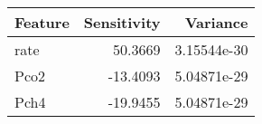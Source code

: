 \begin{longtable}{lrr}
\hline
 Feature   &   Sensitivity &    Variance \\
\hline
 rate      &       50.3669 & 3.15544e-30 \\
 Pco2      &      -13.4093 & 5.04871e-29 \\
 Pch4      &      -19.9455 & 5.04871e-29 \\
\hline
\end{longtable}
